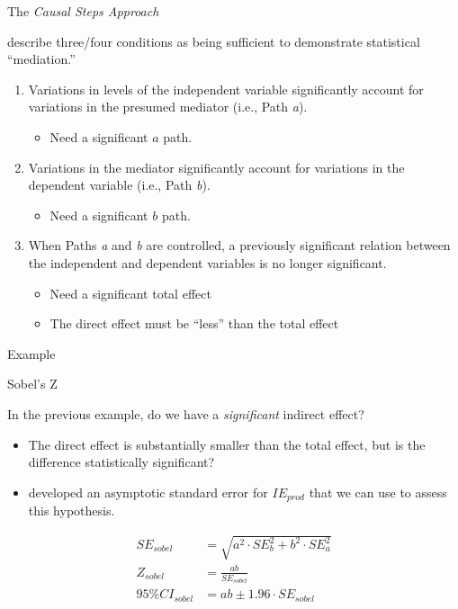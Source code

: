\documentclass{beamer}
\newcommand{\va}[0]{\vspace{12pt}}
\newcommand{\vb}[0]{\vspace{6pt}}
\begin{document}
\begin{frame}{The \emph{Causal Steps Approach}}

  \citet[][p. 1176]{baronKenny:1986} describe three/four conditions
  as being sufficient to demonstrate statistical ``mediation.''
  \va
  \begin{enumerate}
  \item Variations in levels of the independent variable significantly
    account for variations in the presumed mediator (i.e., Path
    \emph{a}).
    \begin{itemize}
      \item Need a significant $a$ path.
    \end{itemize}
    \vb
  \item Variations in the mediator significantly account for variations
    in the dependent variable (i.e., Path \emph{b}).
    \begin{itemize}
    \item Need a significant $b$ path.
    \end{itemize}
    \vb
  \item When Paths \emph{a} and \emph{b} are controlled, a previously
    significant relation between the independent and dependent
    variables is no longer significant.
    \begin{itemize}
    \item Need a significant total effect
    \item The direct effect must be ``less'' than the total effect
    \end{itemize}
  \end{enumerate}

\end{frame}


\begin{frame}[allowframebreaks]{Example}



\pagebreak



\end{frame}


\begin{frame}{Sobel's Z}

  In the previous example, do we have a \emph{significant} indirect
  effect?
  \va
  \begin{itemize}
  \item The direct effect is substantially smaller than the total
    effect, but is the difference statistically significant?
    \vb
  \item \citet{sobel:1982} developed an asymptotic standard error
    for $IE_{prod}$ that we can use to assess this hypothesis.
  \end{itemize}

  \begin{align}
    SE_{sobel} &= \sqrt{a^2 \cdot SE_b^2 + b^2 \cdot SE_a^2}\\
    Z_{sobel} &= \frac{ab}{SE_{sobel}}\\
    95\% CI_{sobel} &= ab \pm 1.96 \cdot SE_{sobel}
  \end{align}

\end{frame}
\end{document}
